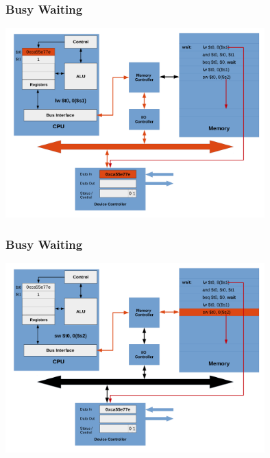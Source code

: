 \documentclass{beamer}
\begin{document}
\begin{frame}%
\frametitle{Busy Waiting}

\vspace*{-0.2cm}
\begin{center}
\hspace*{-1cm}\includegraphics[width=10cm]{busy_waiting19.pdf}
\end{center}

\end{frame}

\begin{frame}%
\frametitle{Busy Waiting}

\vspace*{-0.2cm}
\begin{center}
\hspace*{-1cm}\includegraphics[width=10cm]{busy_waiting20.pdf}
\end{center}

\end{frame}
\end{document}
